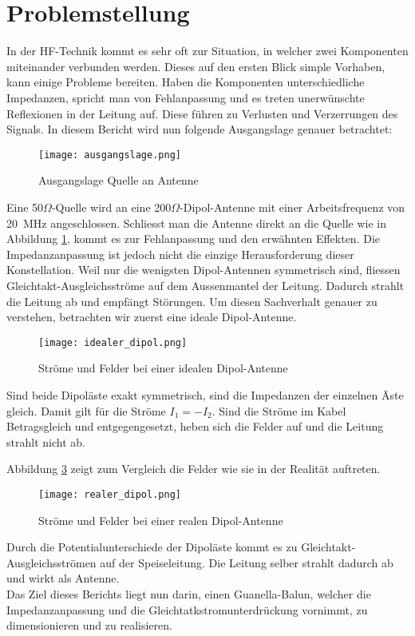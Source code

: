 \section{Problemstellung}
In der HF-Technik kommt es sehr oft zur Situation, in welcher zwei Komponenten miteinander verbunden werden. Dieses auf den ersten Blick simple Vorhaben, kann einige Probleme bereiten. Haben die Komponenten unterschiedliche Impedanzen, spricht man von Fehlanpassung und es treten unerwünschte Reflexionen in der Leitung auf. Diese führen zu Verlusten und Verzerrungen des Signals. In diesem Bericht wird nun folgende Ausgangslage genauer betrachtet:
\begin{figure}[h]
	\centering
	\texttt{[image: ausgangslage.png]}
	\caption{Ausgangslage Quelle an Antenne}\label{fig:ausgangslage}
\end{figure}

Eine 50$\Omega$-Quelle wird an eine 200$\Omega$-Dipol-Antenne mit einer Arbeitsfrequenz von \SI{20}{MHz} angeschlossen. Schliesst man die Antenne direkt an die Quelle wie in Abbildung \ref{fig:ausgangslage}, kommt es zur Fehlanpassung und den erwähnten Effekten. Die Impedanzanpassung ist jedoch nicht die einzige Herausforderung dieser Konstellation.
\newline
Weil nur die wenigsten Dipol-Antennen symmetrisch sind, fliessen Gleichtakt-Ausgleichsströme auf dem Aussenmantel der Leitung. Dadurch strahlt die Leitung ab und empfängt Störungen. Um diesen Sachverhalt genauer zu verstehen, betrachten wir zuerst eine ideale Dipol-Antenne.

\begin{figure}[H]
	\centering
	\texttt{[image: idealer\_dipol.png]}
	\caption{Ströme und Felder bei einer idealen Dipol-Antenne}\label{fig:idealer_dipol}
\end{figure}

Sind beide Dipoläste exakt symmetrisch, sind die Impedanzen der einzelnen Äste gleich. Damit gilt für die Ströme $I_{1}=-I_{2}$. Sind die Ströme im Kabel Betragsgleich und entgegengesetzt, heben sich die Felder auf und die Leitung strahlt nicht ab.

Abbildung \ref{fig:realer_dipol} zeigt zum Vergleich die Felder wie sie in der Realität auftreten.
\begin{figure}[H]
	\centering
	\texttt{[image: realer\_dipol.png]}
	\caption{Ströme und Felder bei einer realen Dipol-Antenne}\label{fig:realer_dipol}
\end{figure}

Durch die Potentialunterschiede der Dipoläste kommt es zu Gleichtakt-Ausgleichsströmen auf der Speiseleitung. Die Leitung selber strahlt dadurch ab und wirkt als Antenne. \\

Das Ziel dieses Berichts liegt nun darin, einen Guanella-Balun, welcher die Impedanzanpassung und die Gleichtatkstromunterdrückung vornimmt, zu dimensionieren und zu realisieren.